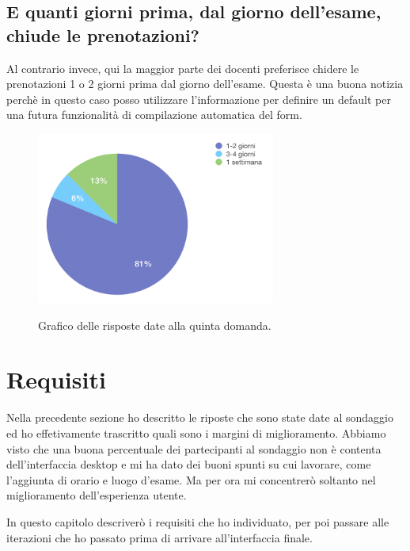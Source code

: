 \documentclass[Lau, oneside]{sapthesis}%
\begin{document}
\subsection{E quanti giorni prima, dal giorno dell’esame, chiude le prenotazioni? }
Al contrario invece, qui la maggior parte dei docenti preferisce chidere le prenotazioni 1 o 2 giorni prima dal giorno dell'esame. Questa è una buona notizia perchè in questo caso posso utilizzare l'informazione per definire un default per una futura funzionalità di compilazione automatica del form.
\begin{figure}[h]
	\caption{Grafico delle risposte date alla quinta domanda.}
	\centering
	\includegraphics[width=0.7\textwidth]{d-v}
	\label{fig:d-v}
\end{figure}


\section{Requisiti}
\label{sec:ui}
Nella precedente sezione ho descritto le riposte che sono state date al sondaggio ed ho effetivamente trascritto quali sono i margini di miglioramento. Abbiamo visto che una buona percentuale dei partecipanti al sondaggio non è contenta dell'interfaccia desktop e mi ha dato dei buoni spunti su cui lavorare, come l'aggiunta di orario e luogo d'esame. Ma per ora mi concentrerò soltanto nel miglioramento dell'esperienza utente.

In questo capitolo descriverò i requisiti che ho individuato, per poi passare alle iterazioni che ho passato prima di arrivare all'interfaccia finale.
\end{document}

